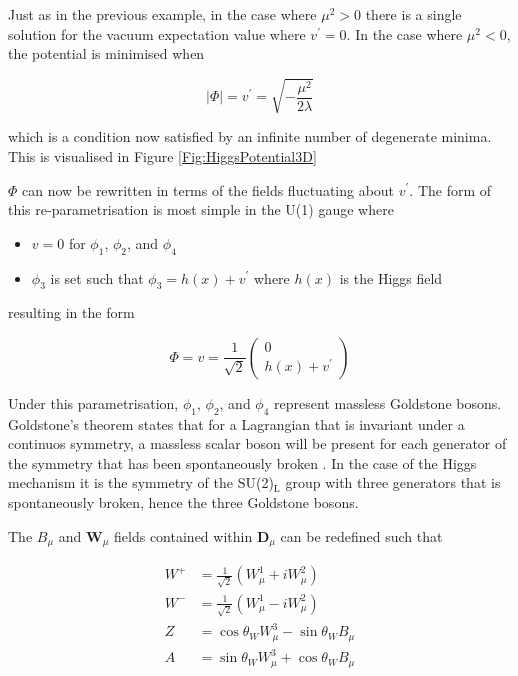 \documentclass[12pt,a4paper,epsf,portrait,times,epsfig]{report}
\begin{document}
	Just as in the previous example, in the case where $\mu^{2} > 0$ there is a single solution for the vacuum expectation value where $v^{\prime} = 0$. In the case where $\mu^{2} < 0$, the potential is minimised when

	\begin{equation}
		|\Phi| = v^{\prime} = \sqrt{-\frac{\mu^{2}}{2\lambda}}
	\end{equation}

	which is a condition now satisfied by an infinite number of degenerate minima. This is visualised in Figure \ref{Fig:HiggsPotential3D} 

	$\Phi$ can now be rewritten in terms of the fields fluctuating about $v^{\prime}$. The form of this re-parametrisation is most simple in the U(1) gauge where 
	
	\begin{itemize}
		\item $v = 0$ for $\phi_{1}$, $\phi_{2}$, and $\phi_{4}$
		\item $\phi_{3}$ is set such that $\phi_{3}=h(x)+v^{\prime}$ where $h(x)$ is the Higgs field 
	\end{itemize}
		
	resulting in the form

	\begin{equation}
		\Phi = v = \frac{1}{\sqrt{2}}\begin{pmatrix}
			0 \\
			h(x)+v^{\prime}
		\end{pmatrix}
	\end{equation}

	Under this parametrisation, $\phi_{1}$, $\phi_{2}$, and $\phi_{4}$ represent massless Goldstone bosons. Goldstone's theorem states that for a Lagrangian that is invariant under a continuos symmetry, a massless scalar boson will be present for each generator of the symmetry that has been spontaneously broken \cite{GoldstoneTheorem}. In the case of the Higgs mechanism it is the symmetry of the SU(2)$_{\mathrm{L}}$ group with three generators that is spontaneously broken, hence the three Goldstone bosons. \par

	The $B_{\mu}$ and $\textbf{W}_{\mu}$ fields contained within $\textbf{D}_{\mu}$ can be redefined such that

	\begin{align}
		W^{+} &=\frac{1}{\sqrt{2}}(W^{1}_{\mu}+iW^{2}_{\mu}) \\
		W^{-} &=\frac{1}{\sqrt{2}}(W^{1}_{\mu}-iW^{2}_{\mu}) \\
		Z &=\cos\theta_{W}W^{3}_{\mu}-\sin\theta_{W}B_{\mu} \\
		A &=\sin\theta_{W}W^{3}_{\mu}+\cos\theta_{W}B_{\mu}
	\end{align}
\end{document}
